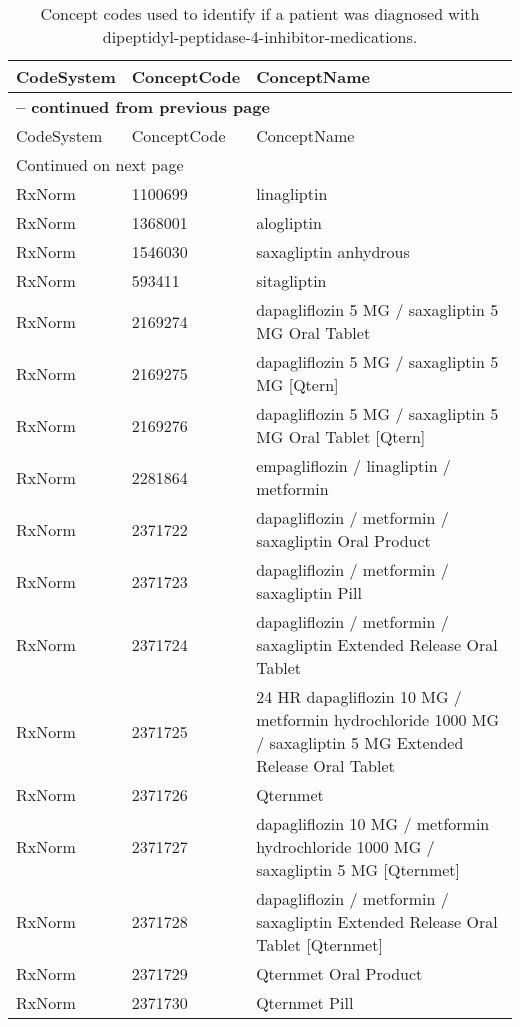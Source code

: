 \begin{longtable}{p{}p{}p{}}
\caption{Concept codes used to identify if a patient was diagnosed with dipeptidyl-peptidase-4-inhibitor-medications.} \\ 
 CodeSystem & ConceptCode & ConceptName \\ 
  \hline 
\endfirsthead 
\multicolumn{3}{p{\textwidth}}{{ \bfseries \tablename \thetable{} -- continued from previous page}} \\ 
\hline CodeSystem & ConceptCode & ConceptName \\ \hline 
\endhead 
\hline \multicolumn{3}{p{\textwidth}}{{Continued on next page}} \\ \hline 
\endfoot 
\hline 
\endlastfoot 
 \hline
RxNorm & 1100699 & linagliptin \\ 
  RxNorm & 1368001 & alogliptin \\ 
  RxNorm & 1546030 & saxagliptin anhydrous \\ 
  RxNorm & 593411 & sitagliptin \\ 
  RxNorm & 2169274 & dapagliflozin 5 MG / saxagliptin 5 MG Oral Tablet \\ 
  RxNorm & 2169275 & dapagliflozin 5 MG / saxagliptin 5 MG [Qtern] \\ 
  RxNorm & 2169276 & dapagliflozin 5 MG / saxagliptin 5 MG Oral Tablet [Qtern] \\ 
  RxNorm & 2281864 & empagliflozin / linagliptin / metformin \\ 
  RxNorm & 2371722 & dapagliflozin / metformin / saxagliptin Oral Product \\ 
  RxNorm & 2371723 & dapagliflozin / metformin / saxagliptin Pill \\ 
  RxNorm & 2371724 & dapagliflozin / metformin / saxagliptin Extended Release Oral Tablet \\ 
  RxNorm & 2371725 & 24 HR dapagliflozin 10 MG / metformin hydrochloride 1000 MG / saxagliptin 5 MG Extended Release Oral Tablet \\ 
  RxNorm & 2371726 & Qternmet \\ 
  RxNorm & 2371727 & dapagliflozin 10 MG / metformin hydrochloride 1000 MG / saxagliptin 5 MG [Qternmet] \\ 
  RxNorm & 2371728 & dapagliflozin / metformin / saxagliptin Extended Release Oral Tablet [Qternmet] \\ 
  RxNorm & 2371729 & Qternmet Oral Product \\ 
  RxNorm & 2371730 & Qternmet Pill \\ 

\end{longtable}
